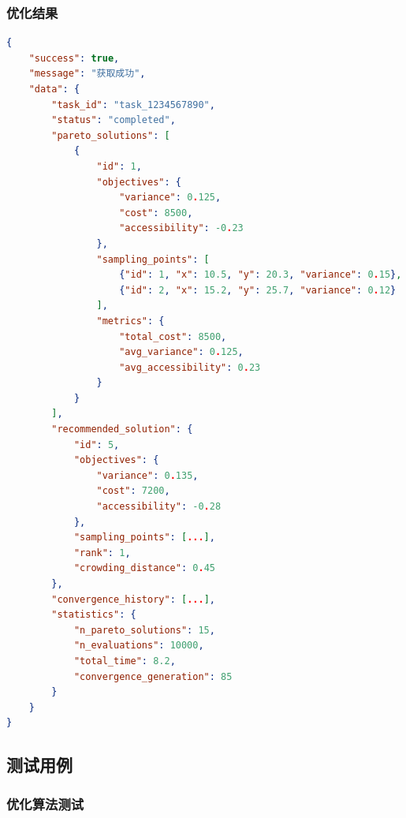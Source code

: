 \documentclass[12pt,a4paper,openany]{report}
\begin{document}
\subsubsection{优化结果}

\begin{lstlisting}[language=JSON, caption=优化结果]
{
    "success": true,
    "message": "获取成功",
    "data": {
        "task_id": "task_1234567890",
        "status": "completed",
        "pareto_solutions": [
            {
                "id": 1,
                "objectives": {
                    "variance": 0.125,
                    "cost": 8500,
                    "accessibility": -0.23
                },
                "sampling_points": [
                    {"id": 1, "x": 10.5, "y": 20.3, "variance": 0.15},
                    {"id": 2, "x": 15.2, "y": 25.7, "variance": 0.12}
                ],
                "metrics": {
                    "total_cost": 8500,
                    "avg_variance": 0.125,
                    "avg_accessibility": 0.23
                }
            }
        ],
        "recommended_solution": {
            "id": 5,
            "objectives": {
                "variance": 0.135,
                "cost": 7200,
                "accessibility": -0.28
            },
            "sampling_points": [...],
            "rank": 1,
            "crowding_distance": 0.45
        },
        "convergence_history": [...],
        "statistics": {
            "n_pareto_solutions": 15,
            "n_evaluations": 10000,
            "total_time": 8.2,
            "convergence_generation": 85
        }
    }
}
\end{lstlisting}

\subsection{测试用例}

\subsubsection{优化算法测试}
\end{document}
